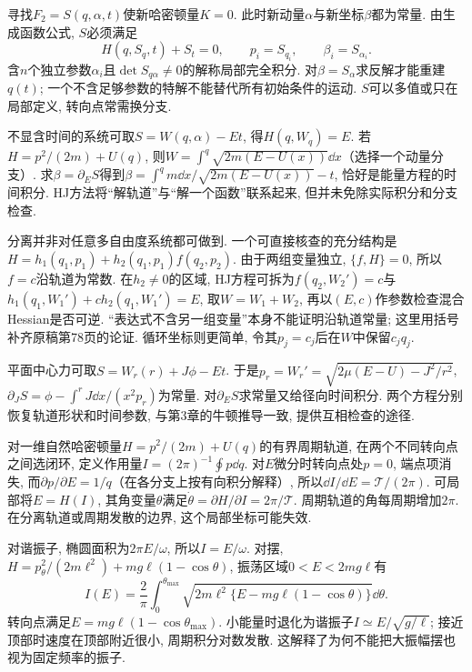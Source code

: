 寻找$F_2=S(q,\alpha,t)$使新哈密顿量$K=0$. 此时新动量$\alpha$与新坐标$\beta$都为常量. 由生成函数公式, $S$必须满足
\begin{equation}\label{eq:hj}
H(q,S_q,t)+S_t=0,\qquad p_i=S_{q_i},\qquad \beta_i=S_{\alpha_i}.
\end{equation}
含$n$个独立参数$\alpha_i$且$\det S_{q\alpha}\ne0$的解称局部完全积分. 对$\beta=S_\alpha$求反解才能重建$q(t)$; 一个不含足够参数的特解不能替代所有初始条件的运动. $S$可以多值或只在局部定义, 转向点常需换分支.

不显含时间的系统可取$S=W(q,\alpha)-Et$, 得$H(q,W_q)=E$. 若$H=p^2/(2m)+U(q)$, 则$W=\int^q\sqrt{2m(E-U(x))}\dd x$（选择一个动量分支）. 求$\beta=\partial_ES$得到$\beta=\int^q m\dd x/\sqrt{2m(E-U(x))}-t$, 恰好是能量方程的时间积分. HJ方法将“解轨道”与“解一个函数”联系起来, 但并未免除实际积分和分支检查.



分离并非对任意多自由度系统都可做到. 一个可直接核查的充分结构是$H=h_1(q_1,p_1)+h_2(q_1,p_1)f(q_2,p_2)$. 由于两组变量独立, $\{f,H\}=0$, 所以$f=c$沿轨道为常数. 在$h_2\ne0$的区域, HJ方程可拆为$f(q_2,W_2')=c$与$h_1(q_1,W_1')+c h_2(q_1,W_1')=E$, 取$W=W_1+W_2$, 再以$(E,c)$作参数检查混合Hessian是否可逆. “表达式不含另一组变量”本身不能证明沿轨道常量; 这里用括号补齐原稿第78页的论证. 循环坐标则更简单, 令其$p_j=c_j$后在$W$中保留$c_jq_j$.

平面中心力可取$S=W_r(r)+J\phi-Et$. 于是$p_r=W_r'=\sqrt{2\mu(E-U)-J^2/r^2}$, $\partial_JS=\phi-\int^r J\dd x/(x^2p_r)$为常量. 对$\partial_ES$求常量又给径向时间积分. 两个方程分别恢复轨道形状和时间参数, 与第3章的牛顿推导一致, 提供互相检查的途径.

对一维自然哈密顿量$H=p^2/(2m)+U(q)$的有界周期轨道, 在两个不同转向点之间选闭环, 定义作用量$I=(2\pi)^{-1}\oint p\dd q$. 对$E$微分时转向点处$p=0$, 端点项消失, 而$\partial p/\partial E=1/\dot q$（在各分支上按有向积分解释）, 所以$\dd I/\dd E=\mathcal T/(2\pi)$. 可局部将$E=H(I)$, 其角变量$\theta$满足$\dot\theta=\partial H/\partial I=2\pi/\mathcal T$. 周期轨道的角每周期增加$2\pi$. 在分离轨道或周期发散的边界, 这个局部坐标可能失效.

对谐振子, 椭圆面积为$2\pi E/\omega$, 所以$I=E/\omega$. 对摆, $H=p_\theta^2/(2m\ell^2)+mg\ell(1-\cos\theta)$, 振荡区域$0<E<2mg\ell$有
\[
I(E)=\frac{2}{\pi}\int_0^{\theta_{\max}}
\sqrt{2m\ell^2\{E-mg\ell(1-\cos\theta)\}}\dd\theta.
\]
转向点满足$E=mg\ell(1-\cos\theta_{\max})$. 小能量时退化为谐振子$I\simeq E/\sqrt{g/\ell}$; 接近顶部时速度在顶部附近很小, 周期积分对数发散. 这解释了为何不能把大振幅摆也视为固定频率的振子.

